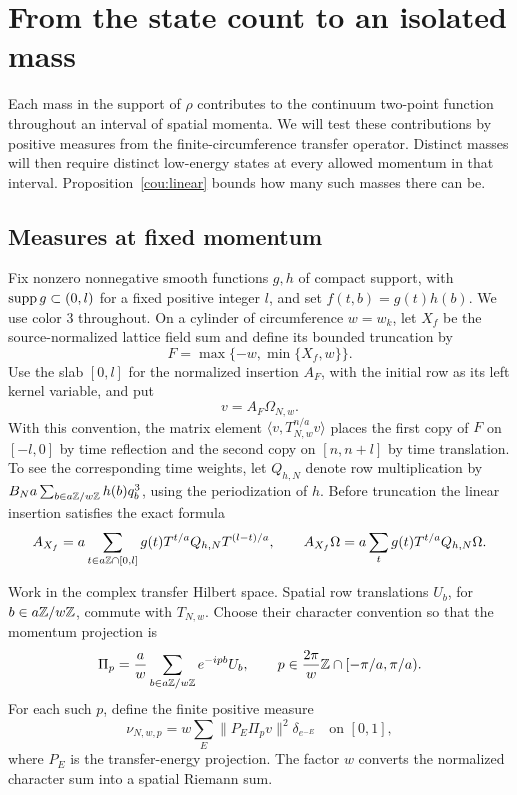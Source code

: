 \section{From the state count to an isolated mass}
\label{sec:mass-support}

Each mass in the support of $\rho$ contributes to the continuum two-point
function throughout an interval of spatial momenta. We will test these
contributions by positive measures from the finite-circumference transfer
operator. Distinct masses will then require distinct low-energy states
at every allowed momentum in that interval. Proposition~\ref{cou:linear}
bounds how many such masses there can be.

\subsection{Measures at fixed momentum}

Fix nonzero nonnegative smooth functions $g,h$ of compact support, with
$\operatorname{supp} g\subset(0,l)$ for a fixed positive integer $l$, and set
$f(t,b)=g(t)h(b)$. We use color $3$ throughout. On a cylinder of
circumference $w=w_k$, let $X_f$ be the source-normalized lattice field
sum and define its bounded truncation by
\[
 F=\max\{-w,\min\{X_f,w\}\}.
\]
Use the slab $[0,l]$ for the normalized insertion $A_F$, with the initial
row as its left kernel variable, and put
\[
 v=A_F\Omega_{N,w}.
\]
With this convention, the matrix element
$\langle v,T_{N,w}^{n/a}v\rangle$ places the first copy of $F$ on
$[-l,0]$ by time reflection and the second copy on $[n,n+l]$ by time
translation. To see the corresponding time weights, let $Q_{h,N}$
denote row multiplication by
$B_Na\sum_{b\in a\mathbb Z/w\mathbb Z}h(b)q_b^3$, using the periodization of $h$.
Before truncation the linear insertion satisfies the exact formula
\[
 A_{X_f}
   =a\sum_{t\in a\mathbb Z\cap[0,l]}
      g(t)T^{t/a}Q_{h,N}T^{(l-t)/a},
 \qquad
 A_{X_f}\Omega
   =a\sum_t g(t)T^{t/a}Q_{h,N}\Omega.
\]

Work in the complex transfer Hilbert space. Spatial row translations
$U_b$, for $b\in a\mathbb Z/w\mathbb Z$, commute with $T_{N,w}$. Choose their character
convention so that the momentum projection is
\[
 \Pi_p=\frac{a}{w}\sum_{b\in a\mathbb Z/w\mathbb Z}e^{-ipb}U_b,
 \qquad
 p\in\frac{2\pi}{w}\mathbb Z\cap[-\pi/a,\pi/a).
\]
For each such $p$, define the finite positive measure
\begin{equation}\label{mass:finite-measure}
 \nu_{N,w,p}
   =w\sum_E\bigl\|P_E\Pi_pv\bigr\|^2\delta_{e^{-E}}
 \quad\text{on }[0,1],
\end{equation}
where $P_E$ is the transfer-energy projection. The factor $w$ converts
the normalized character sum into a spatial Riemann sum.

